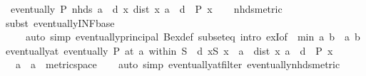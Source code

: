 \begin{isabellebody}
\ \ {\isachardoublequoteopen}eventually\ P\ {\isacharparenleft}{\kern0pt}nhds\ a{\isacharparenright}{\kern0pt}\ {\isasymlongleftrightarrow}\ {\isacharparenleft}{\kern0pt}{\isasymexists}d{\isachargreater}{\kern0pt}{}{\isachardot}{\kern0pt}\ {\isasymforall}x{\isachardot}{\kern0pt}\ dist\ x\ a\ {\isacharless}{\kern0pt}\ d\ {\isasymlongrightarrow}\ P\ x{\isacharparenright}{\kern0pt}{\isachardoublequoteclose}\isanewline
%
\isadelimproof
\ \ %
\endisadelimproof
%
\isatagproof
{}\isamarkupfalse%
\ nhds{\isacharunderscore}{\kern0pt}metric\isanewline
\ \ \isamarkupfalse%
\ {\isacharparenleft}{\kern0pt}subst\ eventually{\isacharunderscore}{\kern0pt}INF{\isacharunderscore}{\kern0pt}base{\isacharparenright}{\kern0pt}\isanewline
\ \ \ \ \ {\isacharparenleft}{\kern0pt}auto\ simp{\isacharcolon}{\kern0pt}\ eventually{\isacharunderscore}{\kern0pt}principal\ Bex{\isacharunderscore}{\kern0pt}def\ subset{\isacharunderscore}{\kern0pt}eq\ intro{\isacharcolon}{\kern0pt}\ exI{\isacharbrackleft}{\kern0pt}of\ {\isacharunderscore}{\kern0pt}\ {\isachardoublequoteopen}min\ a\ b{\isachardoublequoteclose}\ \ a\ b{\isacharbrackright}{\kern0pt}{\isacharparenright}{\kern0pt}%
\endisatagproof
{\isafoldproof}%
%
\isadelimproof
\isanewline
%
\endisadelimproof
\isanewline
{}\isamarkupfalse%
\ eventually{\isacharunderscore}{\kern0pt}at{\isacharcolon}{\kern0pt}\ {\isachardoublequoteopen}eventually\ P\ {\isacharparenleft}{\kern0pt}at\ a\ within\ S{\isacharparenright}{\kern0pt}\ {\isasymlongleftrightarrow}\ {\isacharparenleft}{\kern0pt}{\isasymexists}d{\isachargreater}{\kern0pt}{}{\isachardot}{\kern0pt}\ {\isasymforall}x{\isasymin}S{\isachardot}{\kern0pt}\ x\ {\isasymnoteq}\ a\ {\isasymand}\ dist\ x\ a\ {\isacharless}{\kern0pt}\ d\ {\isasymlongrightarrow}\ P\ x{\isacharparenright}{\kern0pt}{\isachardoublequoteclose}\isanewline
\ \ \ a\ {\isacharcolon}{\kern0pt}{\isacharcolon}{\kern0pt}\ {\isachardoublequoteopen}{\isacharprime}{\kern0pt}a\ {\isacharcolon}{\kern0pt}{\isacharcolon}{\kern0pt}\ metric{\isacharunderscore}{\kern0pt}space{\isachardoublequoteclose}\isanewline
%
\isadelimproof
\ \ %
\endisadelimproof
%
\isatagproof
{}\isamarkupfalse%
\ {\isacharparenleft}{\kern0pt}auto\ simp{\isacharcolon}{\kern0pt}\ eventually{\isacharunderscore}{\kern0pt}at{\isacharunderscore}{\kern0pt}filter\ eventually{\isacharunderscore}{\kern0pt}nhds{\isacharunderscore}{\kern0pt}metric{\isacharparenright}{\kern0pt}%
\endisatagproof
{\isafoldproof}%
%
\isadelimproof
\isanewline
%
\endisadelimproof
\isanewline

\end{isabellebody}
